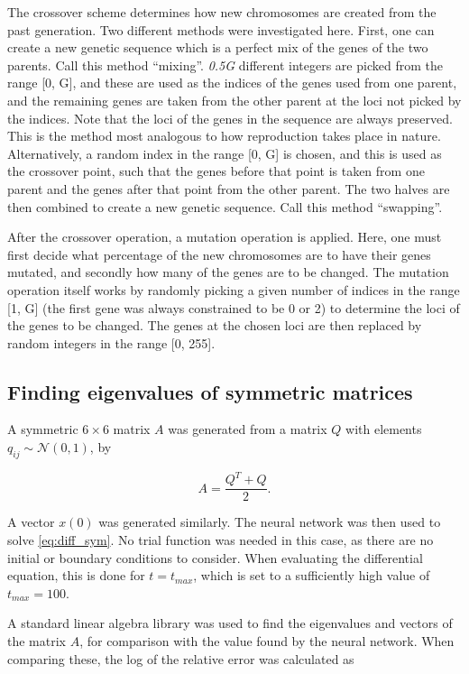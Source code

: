 \documentclass[multicolumn, 9pt]{extarticle}
\begin{document}
The crossover scheme determines how new chromosomes are created from the past generation. Two different methods were investigated here. First, one can create a new genetic sequence which is a perfect mix of the genes of the two parents. Call this method ``mixing''. \textit{0.5G} different integers are picked from the range [0, G], and these are used as the indices of the genes used from one parent, and the remaining genes are taken from the other parent at the loci not picked by the indices. Note that the loci of the genes in the sequence are always preserved. This is the method most analogous to how reproduction takes place in nature. Alternatively, a random index in the range [0, G] is chosen, and this is used as the crossover point, such that the genes before that point is taken from one parent and the genes after that point from the other parent. The two halves are then combined to create a new genetic sequence. Call this method ``swapping''. 

After the crossover operation, a mutation operation is applied. Here, one must first decide what percentage of the new chromosomes are to have their genes mutated, and secondly how many of the genes are to be changed. The mutation operation itself works by randomly picking a given number of indices in the range [1, G] (the first gene was always constrained to be 0 or 2) to determine the loci of the genes to be changed. The genes at the chosen loci are then replaced by random integers in the range [0, 255].


\subsection{Finding eigenvalues of symmetric matrices}
A symmetric $6\times6$ matrix $A$ was generated from a matrix $Q$ with elements $q_{ij} \sim \mathcal{N}(0,1)$, by

\begin{equation*}

	A=\frac{Q^T+Q}{2}.
\end{equation*}

A vector $x(0)$ was generated similarly. The neural network was then used to solve \eqref{eq:diff_sym}. No trial function was needed in this case, as there are no initial or boundary conditions to consider. When evaluating the differential equation, this is done for $t=t_{max}$, which is set to a sufficiently high value of $t_{max}=100$.

A standard linear algebra library was used to find the eigenvalues and vectors of the matrix $A$, for comparison with the value found by the neural network. When comparing these, the log of the relative error was calculated as
\end{document}
